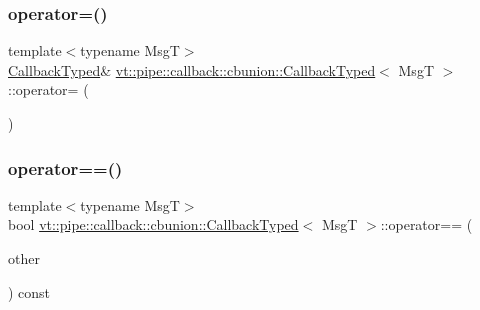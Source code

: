 \mbox{\label{structvt_1_1pipe_1_1callback_1_1cbunion_1_1_callback_typed_a001cf806e3cd6fec3e07bb698901bacd}} 
\subsubsection{\texorpdfstring{operator=()}{operator=()}}
{\footnotesize\ttfamily template$<$typename MsgT$>$ \\
\hyperlink{structvt_1_1pipe_1_1callback_1_1cbunion_1_1_callback_typed}{Callback\+Typed}\& \hyperlink{structvt_1_1pipe_1_1callback_1_1cbunion_1_1_callback_typed}{vt\+::pipe\+::callback\+::cbunion\+::\+Callback\+Typed}$<$ MsgT $>$\+::operator= (\begin{DoxyParamCaption}\item[{\hyperlink{structvt_1_1pipe_1_1callback_1_1cbunion_1_1_callback_typed}{Callback\+Typed}$<$ MsgT $>$ const \&}]{ }\end{DoxyParamCaption})\hspace{0.3cm}{\ttfamily [default]}}

\mbox{\label{structvt_1_1pipe_1_1callback_1_1cbunion_1_1_callback_typed_a6b88345f0d05d52a67730ffecaf68917}} 
\subsubsection{\texorpdfstring{operator==()}{operator==()}\hspace{0.1cm}{\footnotesize\ttfamily [1/2]}}
{\footnotesize\ttfamily template$<$typename MsgT$>$ \\
bool \hyperlink{structvt_1_1pipe_1_1callback_1_1cbunion_1_1_callback_typed}{vt\+::pipe\+::callback\+::cbunion\+::\+Callback\+Typed}$<$ MsgT $>$\+::operator== (\begin{DoxyParamCaption}\item[{\hyperlink{structvt_1_1pipe_1_1callback_1_1cbunion_1_1_callback_typed}{Callback\+Typed}$<$ MsgT $>$ const \&}]{other }\end{DoxyParamCaption}) const\hspace{0.3cm}{\ttfamily [inline]}}

